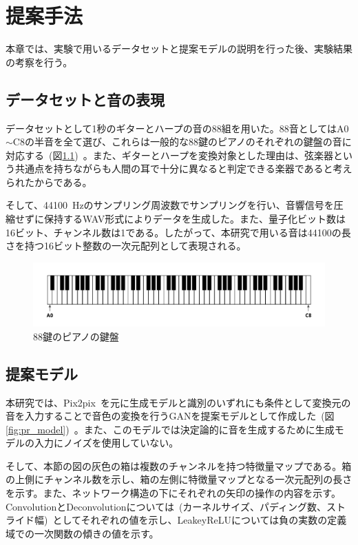 \chapter{提案手法}

本章では、実験で用いるデータセットと提案モデルの説明を行った後、実験結果の考察を行う。

\section{データセットと音の表現}

データセットとして1秒のギターとハープの音の88組を用いた。88音としてはA0$\sim$C8の半音を全て選び、これらは一般的な88鍵のピアノのそれぞれの鍵盤の音に対応する~(図\ref{fig:piano})~。また、ギターとハープを変換対象とした理由は、弦楽器という共通点を持ちながらも人間の耳で十分に異なると判定できる楽器であると考えられたからである。

そして、44100~Hzのサンプリング周波数でサンプリングを行い、音響信号を圧縮せずに保持するWAV形式によりデータを生成した。また、量子化ビット数は16ビット、チャンネル数は1である。したがって、本研究で用いる音は44100の長さを持つ16ビット整数の一次元配列として表現される。

\begin{figure}[b]
\begin{center}
\includegraphics[width=0.9\hsize]{figure/piano.png}
\caption{88鍵のピアノの鍵盤}
\label{fig:piano}
\end{center}
\end{figure}

\section{提案モデル}
\label{sec:proposed}

本研究では、Pix2pix~\cite{pix2pix}を元に生成モデルと識別のいずれにも条件として変換元の音を入力することで音色の変換を行うGANを提案モデルとして作成した~(図\ref{fig:pr_model})~。また、このモデルでは決定論的に音を生成するために生成モデルの入力にノイズを使用していない。

そして、本節の図の灰色の箱は複数のチャンネルを持つ特徴量マップである。箱の上側にチャンネル数を示し、箱の左側に特徴量マップとなる一次元配列の長さを示す。また、ネットワーク構造の下にそれぞれの矢印の操作の内容を示す。ConvolutionとDeconvolutionについては~(カーネルサイズ、パディング数、ストライド幅)~としてそれぞれの値を示し、LeakeyReLUについては負の実数の定義域での一次関数の傾きの値を示す。

